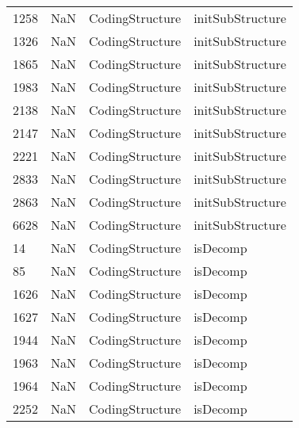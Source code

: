 \begin{tabular}{llll}
1258 &                   NaN &            CodingStructure &                          initSubStructure \\
1326 &                   NaN &            CodingStructure &                          initSubStructure \\
1865 &                   NaN &            CodingStructure &                          initSubStructure \\
1983 &                   NaN &            CodingStructure &                          initSubStructure \\
2138 &                   NaN &            CodingStructure &                          initSubStructure \\
2147 &                   NaN &            CodingStructure &                          initSubStructure \\
2221 &                   NaN &            CodingStructure &                          initSubStructure \\
2833 &                   NaN &            CodingStructure &                          initSubStructure \\
2863 &                   NaN &            CodingStructure &                          initSubStructure \\
6628 &                   NaN &            CodingStructure &                          initSubStructure \\
14   &                   NaN &            CodingStructure &                                  isDecomp \\
85   &                   NaN &            CodingStructure &                                  isDecomp \\
1626 &                   NaN &            CodingStructure &                                  isDecomp \\
1627 &                   NaN &            CodingStructure &                                  isDecomp \\
1944 &                   NaN &            CodingStructure &                                  isDecomp \\
1963 &                   NaN &            CodingStructure &                                  isDecomp \\
1964 &                   NaN &            CodingStructure &                                  isDecomp \\
2252 &                   NaN &            CodingStructure &                                  isDecomp \\

\end{tabular}
